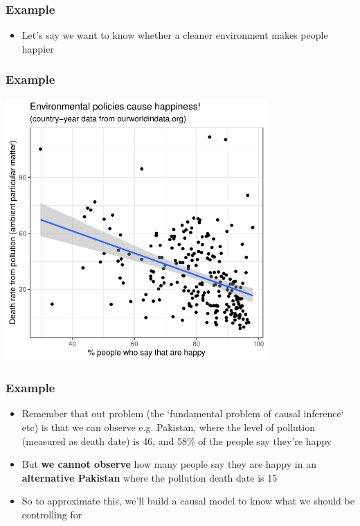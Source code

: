\documentclass[aspectratio=43]{beamer}
\begin{document}
\begin{frame}
\frametitle{Example}
\centering

\begin{itemize}
\item Let's say we want to know whether a cleaner environment makes people happier
\end{itemize}

\end{frame}

\begin{frame}
\frametitle{Example}
\centering

\includegraphics[width = 0.75\textwidth]{../img/happiness_pollution}

\end{frame}

\begin{frame}
\frametitle{Example}
\centering

\begin{itemize}
  \item Remember that out problem (the `fundamental problem of causal inference` etc) is that we can observe e.g. Pakistan, where the level of pollution (measured as death date) is 46, and 58\% of the people say they're happy
  \item But \textbf{we cannot observe} how many people say they are happy in an \textbf{alternative Pakistan} where the pollution death date is 15
  \item So to approximate this, we'll build a causal model to know what we should be controlling for
\end{itemize}

\end{frame}
\end{document}
